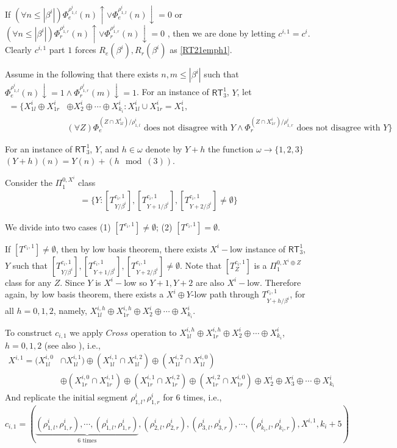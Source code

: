 \documentclass[options]{amsart}
\theoremstyle{definition}
\theoremstyle{remark}
\newtheorem{Ramsey's theorem}[theorem]{Ramsey's theorem}
\begin{document}
If $(\forall n\leq |\beta^i|)
\Phi_e^{\rho^i_{1,l}}(n)\uparrow\vee
\Phi_e^{\rho^i_{1,l}}(n)\downarrow=0$
or 
$(\forall n\leq |\beta^i|)
\Phi_r^{\rho^i_{1,r}}(n)\uparrow\vee
\Phi_r^{\rho^i_{1,r}}(n)\downarrow=0$
, then we are done by letting $c^{i,1} = c^i$.
Clearly $c^{i,1}$ part $1$ forces
$R_e(\beta^i), R_r(\beta^i)$ as 
\ref{RT21emph1}.

Assume in the following 
that there exists $n,m\leq |\beta^i|$
such that $\Phi_e^{\rho^i_{1,l}}(n)
\downarrow=1\wedge
\Phi_r^{\rho^i_{1,r}}(m)\downarrow=1$.
For an instance of $\mathsf{RT}_3^1$,
$Y$,  let
\begin{align}
[T^{c_i,1}_{Y}]
=\{ X^i_{1l}\oplus X^i_{1r}
&\oplus X^i_2\oplus  \cdots
\oplus X^i_{k_i}:
X^i_{1l}\cup X^i_{1r}=X^i_1,\\ \nonumber
&(\forall Z)
\Phi_e^{(Z\cap X^i_{1l})/
\rho^i_{1,l}}\text{ does not
disagree with }Y\wedge
 \Phi_r^{(Z\cap X^i_{1r})/
\rho^i_{1,r}}\text{ does not
disagree with }Y\}
\end{align}

For an instance of $\mathsf{RT}_3^1$,
$Y$, and $h\in\omega$
 denote by
$Y+h$ the function
$\omega\rightarrow\{1,2,3\}$
$(Y+h)(n) = Y(n)+ (h\mod(3))$.

Consider the $\Pi_1^{0,X^i}$
class
\begin{align}
[T^{c_i,1}] =
\{
Y: [T^{c_i,1}_{Y/\beta^i}],
[T^{c_i,1}_{Y+1/\beta^i}],[T^{c_i,1}_{Y+2
/\beta^i}]
\ne\emptyset
\}
\end{align}

We divide into two cases
(1) $[T^{c_i,1}]\ne\emptyset$;
(2) $[T^{c_i,1}]=\emptyset$.

If $[T^{c_i,1}]\ne\emptyset$, then
by low basis theorem,
there exists  $X^i-$low
instance
of $\mathsf{RT}_3^1$, $ Y$
such that
 $[T^{c_i,1}_{Y/\beta^i}],
[T^{c_i,1}_{Y+1/\beta^i}],[T^{c_i,1}_{Y+2
/\beta^i}]
\ne\emptyset$.
Note that
$[T^{c_i,1}_Z]$ is a
$\Pi_1^{0,X^i\oplus Z}$ class
for any $Z$.
Since $Y$ is $X^i-$low so
$Y+1,Y+2$ are also $X^i-$low.
Therefore again, by low basis theorem,
there exists a $X^i\oplus Y$-low
path through $T^{c_i,1}_{Y+h/\beta^i}$,
for all $h=0,1,2$,
namely,
$X^{i,h}_{1l}\oplus
X^{i,h}_{1r}\oplus
X^i_{2}\oplus\cdots
\oplus X^i_{k_i}$.

 To construct $c_{i,1}$ we apply
 $Cross$ operation to
$X^{i,h}_{1l}\oplus
X^{i,h}_{1r}\oplus
X^i_{2}\oplus\cdots
\oplus X^i_{k_i}$,
$h=0,1,2$ (see also \cite{liu2015cone}),
i.e.,
\begin{align}
X^{i,1} =
(X^{i,0}_{1l}&\cap
X^{i,1}_{1l})\oplus
(X^{i,1}_{1l}\cap
X^{i,2}_{1l})
\oplus
(X^{i,2}_{1l}\cap
X^{i,0}_{1l})
\\ \nonumber
&\oplus
(X^{i,0}_{1r}\cap
X^{i,1}_{1r})
\oplus
(X^{i,1}_{1r}\cap
X^{i,2}_{1r})
\oplus
(X^{i,2}_{1r}\cap
X^{i,0}_{1r})
\oplus X^i_2\oplus
X^i_3\oplus\cdots
\oplus X^i_{k_i}
\end{align}
And replicate
the initial segment $\rho^i_{1,l},
\rho^i_{1,r}$ for 6 times, i.e.,
$$c_{i,1} =
(\underbrace{(\rho^i_{1,l},\rho^i_{1,r}),
\cdots,
(\rho^i_{1,l},\rho^i_{1,r})}\limits_{6\text{ times}},
(\rho^i_{2,l},\rho^i_{2,r}),
(\rho^i_{3,l},\rho^i_{3,r}),
\cdots,
(\rho^i_{k_i,l},\rho^i_{k_i,r}),
X^{i,1}, k_i+5)$$
\end{document}
